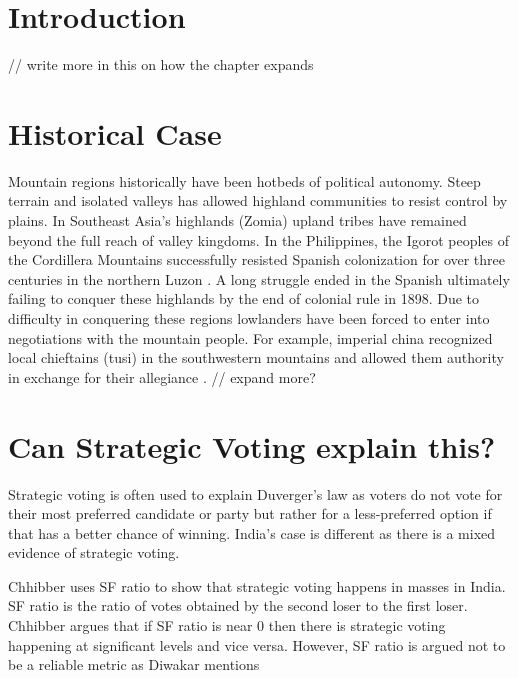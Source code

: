 \section{Introduction}

 // write more in this on how the chapter expands

\section{Historical Case}
Mountain regions historically have been hotbeds of political autonomy. Steep terrain and isolated valleys has allowed highland communities to  resist control by plains. In Southeast Asia’s highlands (Zomia) upland tribes have remained beyond the full reach of valley kingdoms. In the Philippines, the Igorot peoples of the Cordillera Mountains successfully resisted Spanish colonization for over three centuries in the northern Luzon \citep{scott1970igorot}. A long struggle ended in the Spanish ultimately failing to conquer these highlands by the end of colonial rule in 1898. Due to difficulty in conquering these regions lowlanders have been forced to enter into negotiations with the mountain people. For example, imperial china  recognized local chieftains (tusi) in the southwestern mountains and allowed them authority in exchange for their allegiance \citep{took2005native}. // expand more?

\section{Can Strategic Voting explain this?}

Strategic voting is often used to explain Duverger’s law as voters do not vote for their most preferred candidate or party but rather for a less-preferred option if that has a better chance of winning. India’s case is different as there is a mixed evidence of strategic voting. 

\vspace{0.3cm}

Chhibber uses SF ratio to show that strategic voting happens in masses in India. SF ratio is the ratio of votes obtained by the second loser to the first loser. Chhibber argues that if SF ratio is near 0 then there is strategic voting happening at significant levels and vice versa. However, SF ratio is argued not to be a reliable metric as Diwakar mentions 

\vspace{0.3cm}

